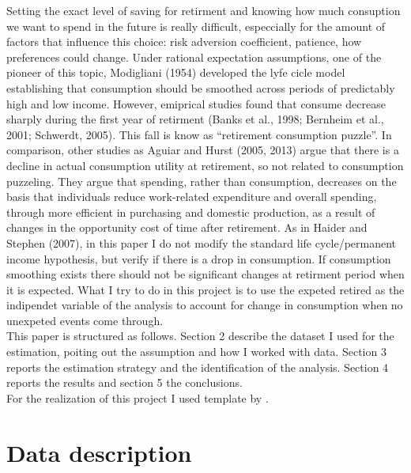 \documentclass[11pt, a4paper, leqno]{article}
\begin{document}
Setting the exact level of saving for retirment and knowing how much consuption we want to spend in the future is really difficult, especcially for the amount of factors that influence this choice: risk adversion coefficient, patience, how preferences could change. Under rational expectation assumptions, one of the pioneer of this topic, Modigliani (1954) developed the lyfe cicle model establishing that consumption should be smoothed across periods of predictably high and low income. However, emiprical studies found that consume decrease sharply during the first year of retirment (Banks et al., 1998; Bernheim et al., 2001; Schwerdt, 2005). This fall is know as “retirement consumption puzzle”. In comparison, other studies as Aguiar and Hurst (2005, 2013) argue that there is a decline in actual consumption utility at retirement, so not related to consumption puzzeling. They argue that spending, rather than consumption, decreases on the basis that individuals reduce work-related expenditure and overall spending, through more efficient in purchasing and domestic production, as a result of changes in the opportunity cost of time after retirement.
As in Haider and Stephen (2007), in this paper I do not modify the standard life cycle/permanent income hypothesis, but verify if there is a drop in consumption. If consumption smoothing exists there should not be significant changes at retirment period when it is expected. What I try to do in this project is to use the expeted retired as the indipendet variable of the analysis to account for change in consumption when no unexpeted events come through.
\\\hspace*{4mm} This paper is structured as follows. Section 2 describe the dataset I used for the estimation, poiting out the assumption and how I worked with data. Section 3 reports the estimation strategy and the identification of the analysis. Section 4 reports the results and section 5 the conclusions.
\\\hspace*{4mm}   For the realization of this project I used template by \citet{GaudeckerEconProjectTemplates}.

\section{Data description}
\label{sec:data-description}
\end{document}
